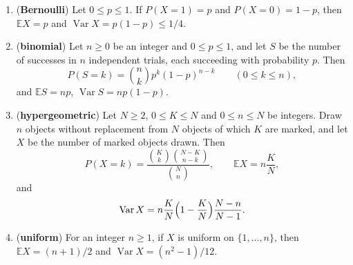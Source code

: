 \begin{proposition}\label{prop:laws}
\begin{enumerate}[label=(\alph*)]
\item (\textbf{Bernoulli}) Let $0\le p\le1$. If $P(X=1)=p$ and $P(X=0)=1-p$, then $\mathbb E X=p$ and $\operatorname{Var}X=p(1-p)\le1/4$.
\item (\textbf{binomial}) Let $n\ge0$ be an integer and $0\le p\le1$, and let $S$ be the number of successes in $n$ independent trials, each succeeding with probability $p$. Then
\[
 P(S=k)=\binom nk p^k(1-p)^{n-k}\qquad(0\le k\le n),
\]
and $\mathbb ES=np$, $\operatorname{Var}S=np(1-p)$.
\item (\textbf{hypergeometric}) Let $N\ge2$, $0\le K\le N$ and $0\le n\le N$ be integers. Draw $n$ objects without replacement from $N$ objects of which $K$ are marked, and let $X$ be the number of marked objects drawn. Then
\[
 P(X=k)=\frac{\binom Kk\binom{N-K}{n-k}}{\binom Nn},
 \qquad
 \mathbb E X=n\frac KN,
\]
and
\[
 \operatorname{Var}X=n\frac KN\Bigl(1-\frac KN\Bigr)\frac{N-n}{N-1}.
\]
\item (\textbf{uniform}) For an integer $n\ge1$, if $X$ is uniform on $\{1,\ldots,n\}$, then $\mathbb EX=(n+1)/2$ and $\operatorname{Var}X=(n^2-1)/12$.
\end{enumerate}
\end{proposition}
